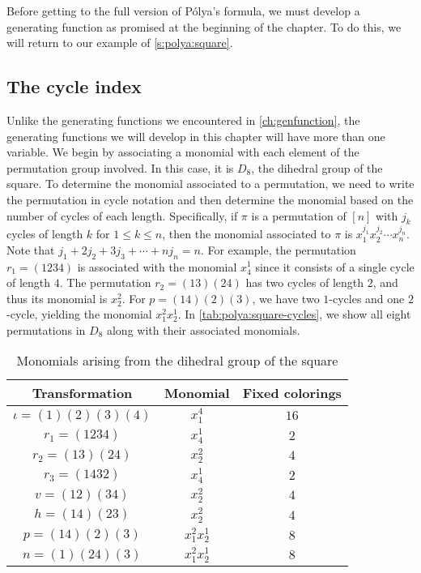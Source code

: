 Before getting to the full version of P\'olya's formula, we must
develop a generating function as promised at the beginning of the
chapter. To do this, we will return to our example of
\autoref{s:polya:square}.

\subsection{The cycle index}\label{ss:polya:polya:cycle-index}

Unlike the generating functions we encountered in
\autoref{ch:genfunction}, the generating functions we will develop in
this chapter will have more than one variable. We begin by associating
a monomial with each element of the permutation group involved. In
this case, it is $D_8$, the dihedral group of the square. To determine
the monomial associated to a permutation, we need to write the
permutation in cycle notation and then determine the monomial based on
the number of cycles of each length. Specifically, if $\pi$ is a
permutation of $[n]$ with $j_k$ cycles of length $k$ for $1\leq k\leq
n$, then the monomial associated to $\pi$ is $x_1^{j_1}x_2^{j_2}\cdots
x_n^{j_n}$. Note that $j_1 + 2j_2 + 3j_3 + \cdots + nj_n = n$. For
example, the permutation $r_1=(1234)$ is associated with the monomial
$x_4^1$ since it consists of a single cycle of length $4$. The
permutation $r_2=(13)(24)$ has two cycles of length $2$, and thus its
monomial is $x_2^2$. For $p=(14)(2)(3)$, we have two $1$-cycles and
one $2$-cycle, yielding the monomial $x_1^2x_2^1$. In
\autoref{tab:polya:square-cycles}, we show all eight permutations in
$D_8$ along with their associated monomials.

\begin{table}
  \centering
  \begin{tabular}{c|c|c}
    Transformation & Monomial & Fixed colorings\\\hline
    $\iota = (1)(2)(3)(4)$  & $x_1^4$& $16$\\[\smallskipamount]
    $r_1 = (1234)$ & $x_4^1$ & $2$\\[\smallskipamount]
    $r_2=(13)(24)$ & $x_2^2$ & $4$\\[\smallskipamount]
    $r_3=(1432)$ & $x_4^1$ & $2$\\[\smallskipamount]
    $v=(12)(34)$ & $x_2^2$ & $4$\\[\smallskipamount]
    $h=(14)(23)$ & $x_2^2$ & $4$\\[\smallskipamount]
    $p=(14)(2)(3)$ & $x_1^2x_2^1$ & $8$\\[\smallskipamount]
    $n=(1)(24)(3)$ & $x_1^2x_2^1$ & $8$
  \end{tabular}
  \caption{Monomials arising from the dihedral group of the square}
  \label{tab:polya:square-cycles}
\end{table}

